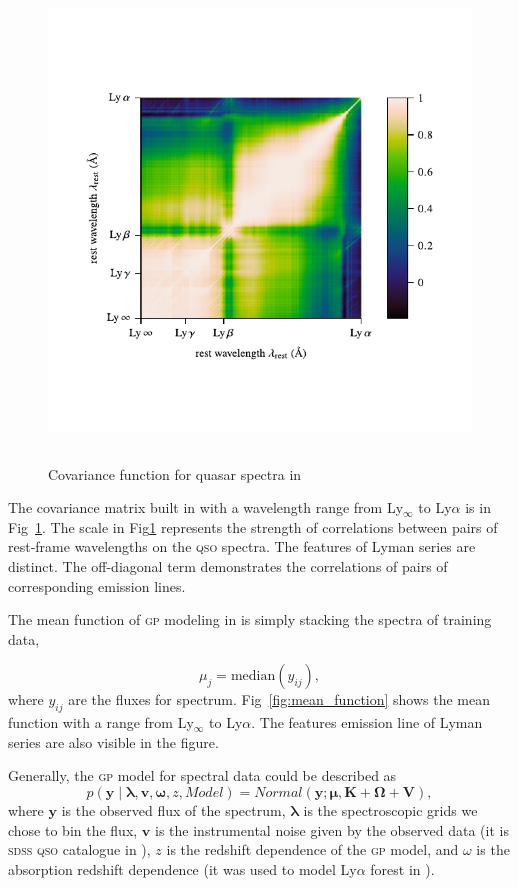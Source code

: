 \documentclass{ar-1col}
\begin{document}
\begin{figure}
    \includegraphics[width=5in, height=5in]{images/covariance.pdf}
    \caption{Covariance function for quasar spectra in \citet{Garnett17}}
    \label{fig:covariance}
\end{figure}

The covariance matrix built in \citet{Garnett17} with a wavelength range from Ly$_\infty$ to Ly$\alpha$ is in Fig~\ref{fig:covariance}. 
The scale in Fig\ref{fig:covariance} represents the strength of correlations between pairs of rest-frame wavelengths on the \textsc{qso} spectra.
The features of Lyman series are distinct.
The off-diagonal term demonstrates the correlations of pairs of corresponding emission lines.

The mean function of \textsc{gp} modeling in \citet{Garnett17} is simply stacking the spectra of training data, 

\begin{equation}
    \mu_j = \mathrm{median } (y_{ij}),
\end{equation}
where $y_{ij}$ are the fluxes for spectrum. Fig~\ref{fig:mean_function} shows the mean function with a range from Ly$_\infty$ to Ly$\alpha$. 
The features emission line of Lyman series are also visible in the figure.

Generally, the \textsc{gp} model for spectral data could be described as
\begin{equation}
    p( \mathbf{y} \mid \mathbf{\lambda}, \mathbf{v}, \mathbf{\omega}, z, Model ) 
    = Normal( \mathbf{y}; \mathbf{\mu}, \mathbf{K} + \mathbf{\Omega} + \mathbf{V} ), 
\end{equation}
where $\mathbf{y}$ is the observed flux of the spectrum, 
$\mathbf{\lambda}$ is the spectroscopic grids we chose to bin the flux, 
$\mathbf{v}$ is the instrumental noise given by the observed data (it is \textsc{sdss} \textsc{qso} catalogue \citep{SDSS09} in \citet{Garnett17}), $z$ is the redshift dependence of the \textsc{gp} model, and $\omega$ is the absorption redshift dependence (it was used to model
 Ly$\alpha$ forest in \citet{Garnett17}). 
 
\end{document}
